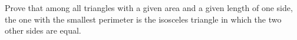 Prove that among all triangles with a given area and a given length of one side, the one with the smallest perimeter is the isosceles triangle in which the two other sides are equal.
